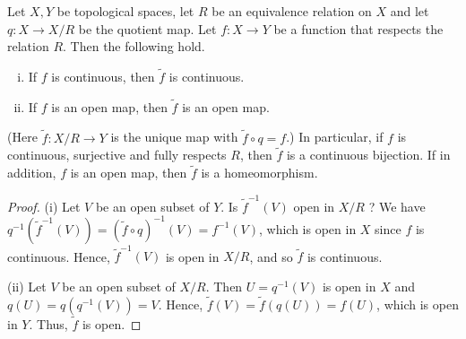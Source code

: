 \documentclass[a4paper]{article}
\begin{document}
\begin{proposition}\label{prop:4.10}
    Let $X, Y$ be topological spaces, let $R$ be an equivalence relation on $X$ and let $q: X \rightarrow X / R$ be the quotient map. Let $f: X \rightarrow Y$ be a function that respects the relation $R$. Then the following hold.
    \begin{enumerate}[(i)]
        \item If $f$ is continuous, then $\tilde{f}$ is continuous.

        \item If $f$ is an open map, then $\tilde{f}$ is an open map.
    \end{enumerate}
    (Here $\tilde{f}: X / R \rightarrow Y$ is the unique map with $\tilde{f} \circ q=f$.) In particular, if $f$ is continuous, surjective and fully respects $R$, then $\tilde{f}$ is a continuous bijection. If in addition, $f$ is an open map, then $\tilde{f}$ is a homeomorphism.
\end{proposition}
\begin{proof}
    (i) Let $V$ be an open subset of $Y$. Is $\tilde{f}^{-1}(V)$ open in $X / R$ ? We have $q^{-1}\left(\tilde{f}^{-1}(V)\right)=(\tilde{f} \circ q)^{-1}(V)=f^{-1}(V)$, which is open in $X$ since $f$ is continuous. Hence, $\tilde{f}^{-1}(V)$ is open in $X / R$, and so $\tilde{f}$ is continuous.

    (ii) Let $V$ be an open subset of $X / R$. Then $U=q^{-1}(V)$ is open in $X$ and $q(U)=q\left(q^{-1}(V)\right)=V$. Hence, $\tilde{f}(V)=\tilde{f}(q(U))=f(U)$, which is open in $Y$. Thus, $\tilde{f}$ is open.
\end{proof}
\end{document}
